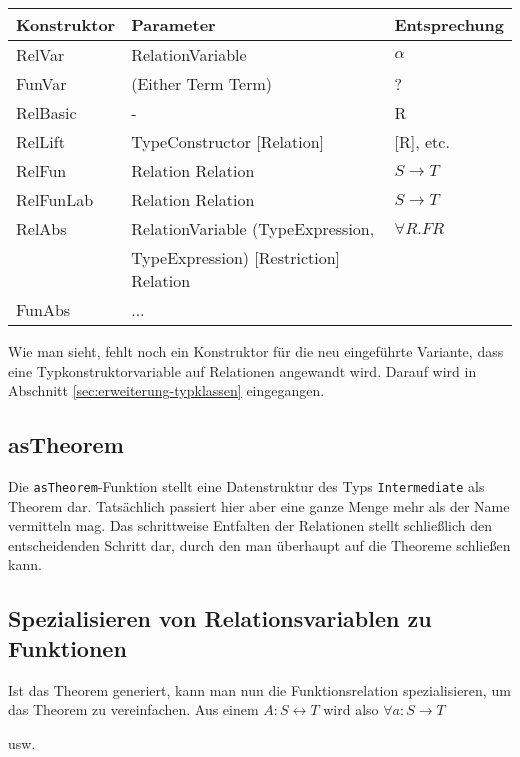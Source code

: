 \documentclass[11pt]{article} %
\begin{document}

\begin{tabular}{| l | l | l |}
\hline
Konstruktor & Parameter & Entsprechung \\
\hline
RelVar & RelationVariable & $\alpha$ \\
FunVar & (Either Term Term) & ? \\
RelBasic & - & R \\
RelLift & TypeConstructor [Relation] & [R], etc. \\
RelFun & Relation Relation & $S \rightarrow T$ \\
RelFunLab & Relation Relation & $S \rightarrow T$ \\
RelAbs & RelationVariable (TypeExpression,  & $\forall R . F R$ \\
& TypeExpression) [Restriction] Relation & \\
FunAbs & ... & \\
\hline
\end{tabular}

Wie man sieht, fehlt noch ein Konstruktor für die neu eingeführte Variante, dass eine Typkonstruktorvariable auf Relationen
angewandt wird. Darauf wird in Abschnitt \ref{sec:erweiterung-typklassen} eingegangen.

\subsection{asTheorem}

Die \texttt{asTheorem}-Funktion stellt eine Datenstruktur des Typs \texttt{Intermediate} als Theorem dar. Tatsächlich passiert hier aber eine ganze Menge mehr als der Name
vermitteln mag. Das schrittweise Entfalten  der Relationen stellt schließlich den entscheidenden Schritt dar, durch den man überhaupt auf
die Theoreme schließen kann.


\subsection{Spezialisieren von Relationsvariablen zu Funktionen}

Ist das Theorem generiert, kann man nun die Funktionsrelation spezialisieren, um das Theorem zu vereinfachen. Aus einem
$A : S \leftrightarrow T$ wird also $\forall a : S \rightarrow T$

usw.
\end{document}

